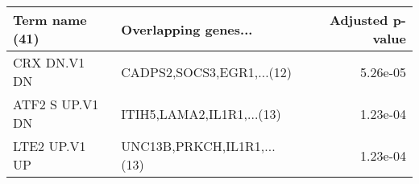 \begin{tabular}{llr}
\toprule
 Term name (41) &       Overlapping genes... &  Adjusted p-value \\
\midrule
   CRX DN.V1 DN &  CADPS2,SOCS3,EGR1,...(12) &          5.26e-05 \\
ATF2 S UP.V1 DN &  ITIH5,LAMA2,IL1R1,...(13) &          1.23e-04 \\
  LTE2 UP.V1 UP & UNC13B,PRKCH,IL1R1,...(13) &          1.23e-04 \\
\bottomrule
\end{tabular}
